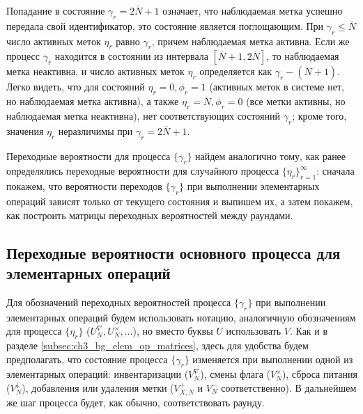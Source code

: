 Попадание в состояние $\gamma_r = 2\overline{N} + 1$ означает, что наблюдаемая метка успешно передала свой идентификатор, это состояние является поглощающим. При $\gamma_r \leqslant \overline{N}$ число активных меток $\eta_r$ равно $\gamma_r$, причем наблюдаемая метка активна. Если же процесс $\gamma_r$ находится в состоянии из интервала $[\overline{N}+1, 2\overline{N}]$, то наблюдаемая метка неактивна, и число активных меток $\eta_r$ определяется как $\gamma_r - (\overline{N}+1)$. Легко видеть, что для состояний $\eta_r = 0, \phi_r = 1$ (активных меток в системе нет, но наблюдаемая метка активна), а также $\eta_r = \overline{N}, \phi_r = 0$ (все метки активны, но наблюдаемая метка неактивна), нет соответствующих состояний $\gamma_r$; кроме того, значения $\eta_r$ неразличимы при $\gamma_r = 2\overline{N} + 1$.

Переходные вероятности для процесса $\{ \gamma_r \}$ найдем аналогично тому, как ранее определялись переходные вероятности для случайного процесса $\{ \eta_r \}_{r=1}^\infty$: сначала покажем, что вероятности переходов $\{ \gamma_r \}$ при выполнении элементарных операций зависят только от текущего состояния и выпишем их, а затем покажем, как построить матрицы переходных вероятностей между раундами.



\subsection{Переходные вероятности основного процесса для элементарных операций}
Для обозначений переходных вероятностей процесса $\{ \gamma_r \}$ при выполнении элементарных операций будем использовать нотацию, аналогичную обозначениям для процесса $\{ \eta_r \}$ ($U_N^{\nabla}, U_N^{\times}, \dots$), но вместо буквы $U$ использовать $V$. Как и в разделе \ref{subsec:ch3_bg_elem_op_matrices}, здесь для удобства будем предполагать, что состояние процесса $\{ \gamma_r \}$ изменяется при выполнении одной из элементарных операций: инвентаризации ($V_N^\nabla$), смены флага ($V_N^\times$), сброса питания ($V_N^\downarrow$), добавления или удаления метки ($V^+_{X,N}$ и $V^-_N$ соответственно). В дальнейшем же шаг процесса будет, как обычно, соответствовать раунду.

